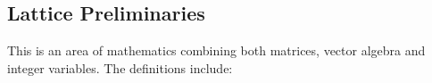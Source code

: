 

\subsection{Lattice Preliminaries}
\label{ssub:The mathematics}
This is an area of mathematics combining both matrices, vector algebra
and integer variables. The definitions include:

